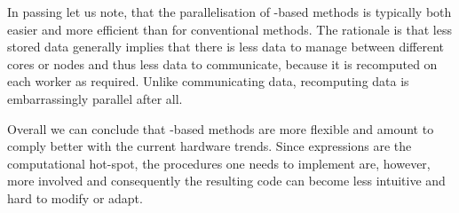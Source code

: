 In passing let us note,
that the parallelisation of \contraction-based methods
is typically both easier and more efficient than for conventional methods.
The rationale is that less stored data generally implies
that there is less data to manage between different cores or nodes
and thus less data to communicate,
because it is recomputed on each worker as required.
Unlike communicating data,
recomputing data is embarrassingly parallel after all.

Overall we can conclude that \contraction-based methods are more flexible
and amount to comply better with the current hardware trends.
Since \contraction expressions are the computational hot-spot,
the procedures one needs to implement are, however,
more involved and consequently the resulting code can become less intuitive
and hard to modify or adapt.
